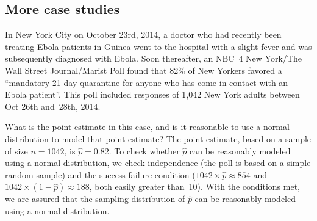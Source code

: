 \D{\newpage}

\subsection{More case studies}


\newcommand{\wsjebolapollsize}{1042}
\newcommand{\wsjebolapollsizecomma}{1,042}
\newcommand{\wsjebolapollprop}{0.82}
\newcommand{\wsjebolapollpropcomplement}{0.18}
\newcommand{\wsjebolapollpercent}{82}
\newcommand{\wsjebolapollpercentcomplement}{18}
\newcommand{\wsjebolapollcount}{854}
\newcommand{\wsjebolapollcountcomplement}{188}
\newcommand{\wsjebolapollse}{0.012}


In New York City on October 23rd, 2014, a doctor who had recently been
treating Ebola patients in Guinea went to the hospital with a slight fever
and was subsequently diagnosed with Ebola. Soon thereafter,
an NBC~4 New York/The Wall Street Journal/Marist Poll found that
\wsjebolapollpercent{}\% of New Yorkers favored a ``mandatory 21-day
quarantine for anyone who has come in contact with an Ebola
patient''. This poll included responses
of \wsjebolapollsizecomma{} New York adults between
Oct 26th and~28th, 2014.

\begin{examplewrap}
\begin{nexample}{What is the point estimate in this case,
    and is it reasonable to
    use a normal distribution to model that point estimate?}
  The point estimate, based on a sample of size $n = \wsjebolapollsize{}$,
  is $\hat{p} = \wsjebolapollprop{}$.
  To check whether $\hat{p}$ can be reasonably
  modeled using a normal distribution, we check independence
  (the poll is based on a simple random sample) and the
  success-failure condition
  ($\wsjebolapollsize{} \times \hat{p} \approx \wsjebolapollcount{}$
  and $\wsjebolapollsize{} \times (1 - \hat{p})
      \approx \wsjebolapollcountcomplement{}$,
  both easily greater than~10).
  With the conditions met, we are assured
  that the sampling distribution of $\hat{p}$ can be
  reasonably modeled using a normal distribution.
\end{nexample}
\end{examplewrap}

